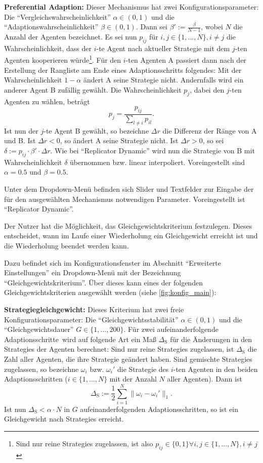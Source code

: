 \documentclass[parskip=full,11pt]{scrartcl}
\def\adapt{Adaptionsschritt}
\def\adapts{Adaptionsschritte}
\begin{document}
\textbf{Preferential Adaption:}
Dieser Mechanismus hat zwei Konfigurationsparameter: Die \enquote{Vergleichswahrscheinlichkeit} \(\alpha \in (0,1)\) und die \enquote{Adaptionswahrscheinlichkeit} \(\beta \in (0,1)\). Dann sei \(\beta' := \frac{\beta}{N-1}\), wobei \(N\) die Anzahl der Agenten bezeichnet. Es sei nun \(p_{ij}\) für \(i,j \in \{1,...,N\}, i \neq j\) die Wahrscheinlichkeit, dass der \(i\)-te Agent nach aktueller \Gls{Strategie} mit dem \(j\)-ten Agenten kooperieren würde\footnote{Sind nur reine \Glspl{Strategie} zugelassen, ist also \(p_{ij} \in \{0,1\} \forall i,j \in \{1,...,N\}, i \neq j\)}. Für den \(i\)-ten Agenten A passiert dann nach der Erstellung der Rangliste am Ende eines \adapt s folgendes: Mit der Wahrscheinlichkeit \(1 - \alpha\) ändert A seine \Gls{Strategie} nicht. Andernfalls wird ein anderer Agent B zufällig gewählt. Die Wahrscheinlichkeit \(p_j\), dabei den \(j\)-ten Agenten zu wählen, beträgt
\[
p_j = \frac{p_{ij}}{\sum_{l \neq i} p_{il}}.
\]
Ist nun der \(j\)-te Agent B gewählt, so bezeichne \(\Delta r\) die Differenz der Ränge von A und B. Ist \(\Delta r < 0\), so ändert A seine \Gls{Strategie} nicht. Ist \(\Delta r > 0\), so sei \(\delta := p_{ij} \cdot \beta' \cdot \Delta r\). Wie bei \enquote{Replicator Dynamic} wird nun die \Gls{Strategie} von B mit Wahrscheinlichkeit \(\delta\) übernommen bzw. linear interpoliert. Voreingestellt sind \(\alpha = 0.5\) und \(\beta = 0.5\).

Unter dem Dropdown-Menü befinden sich Slider und Textfelder zur Eingabe der für den ausgewählten Mechanismus notwendigen Parameter. Voreingestellt ist \enquote{Replicator Dynamic}.

Der \Gls{Nutzer} hat die Möglichkeit, das Gleichgewichtskriterium festzulegen. Dieses entscheidet, wann im Laufe einer Wiederholung ein Gleichgewicht erreicht ist und die Wiederholung beendet werden kann.

Dazu befindet sich im Konfigurationsfenster im Abschnitt \enquote{Erweiterte Einstellungen} ein Dropdown-Menü mit der Bezeichnung \enquote{Gleichgewichtskriterium}. Über dieses kann eines der folgenden Gleichgewichtskriterien ausgewählt werden (siehe \cref{fig:konfig_main}):

\textbf{Strategiegleichgewicht:}
Dieses Kriterium hat zwei freie Konfigurationsparameter: Die \enquote{Gleichgewichtsstabilität} \(\alpha \in (0,1)\) und die \enquote{Gleichgewichtsdauer} \(G \in \{1,...,200\}\). Für zwei aufeinanderfolgende \adapts\ wird auf folgende Art ein Maß \(\Delta_\text{S}\) für die Änderungen in den \Glspl{Strategie} der Agenten berechnet: Sind nur reine \Glspl{Strategie} zugelassen, ist \(\Delta_\text{S}\)  die Zahl aller Agenten, die ihre \Gls{Strategie} geändert haben. Sind \glspl{gemischte Strategie} zugelassen, so bezeichne \(\omega_i\) bzw. \(\omega_i'\) die \Gls{Strategie} des \(i\)-ten Agenten in den beiden \adapts n (\(i \in \{1,...,N\}\) mit der Anzahl \(N\) aller Agenten). Dann ist
\[
\Delta_\text{S} :=\frac 12 \sum_{i=1}^N \|\omega_i - \omega_i'\|_1.
\]
Ist nun \(\Delta_\text{S} < \alpha \cdot N\) in \(G\) aufeinanderfolgenden \adapts n, so ist ein Gleichgewicht nach \Glspl{Strategie} erreicht.
\end{document}
